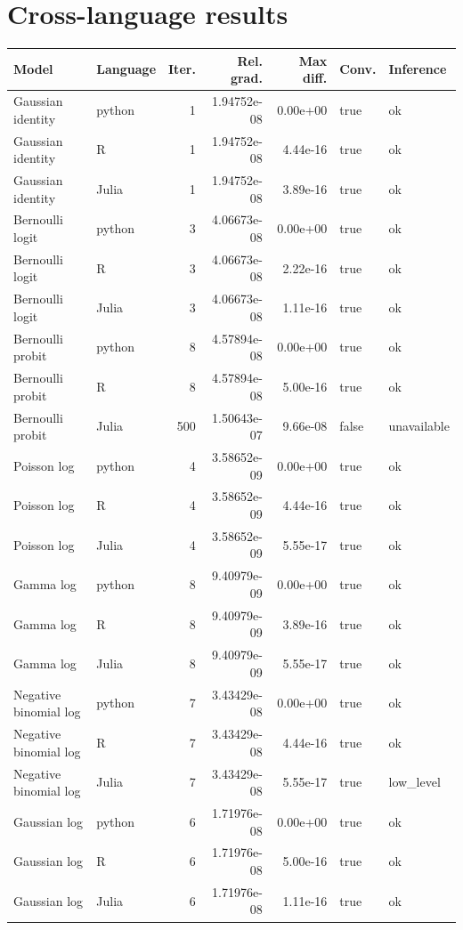 \documentclass[11pt]{article}
\begin{document}
\section{Cross-language results}
\scriptsize
\begin{longtable}{llrrrll}
\toprule Model & Language & Iter. & Rel. grad. & Max diff. & Conv. & Inference \\ \midrule\endhead
Gaussian identity & python & 1 & 1.94752e-08 & 0.00e+00 & true & ok \\
Gaussian identity & R & 1 & 1.94752e-08 & 4.44e-16 & true & ok \\
Gaussian identity & Julia & 1 & 1.94752e-08 & 3.89e-16 & true & ok \\
Bernoulli logit & python & 3 & 4.06673e-08 & 0.00e+00 & true & ok \\
Bernoulli logit & R & 3 & 4.06673e-08 & 2.22e-16 & true & ok \\
Bernoulli logit & Julia & 3 & 4.06673e-08 & 1.11e-16 & true & ok \\
Bernoulli probit & python & 8 & 4.57894e-08 & 0.00e+00 & true & ok \\
Bernoulli probit & R & 8 & 4.57894e-08 & 5.00e-16 & true & ok \\
Bernoulli probit & Julia & 500 & 1.50643e-07 & 9.66e-08 & false & unavailable \\
Poisson log & python & 4 & 3.58652e-09 & 0.00e+00 & true & ok \\
Poisson log & R & 4 & 3.58652e-09 & 4.44e-16 & true & ok \\
Poisson log & Julia & 4 & 3.58652e-09 & 5.55e-17 & true & ok \\
Gamma log & python & 8 & 9.40979e-09 & 0.00e+00 & true & ok \\
Gamma log & R & 8 & 9.40979e-09 & 3.89e-16 & true & ok \\
Gamma log & Julia & 8 & 9.40979e-09 & 5.55e-17 & true & ok \\
Negative binomial log & python & 7 & 3.43429e-08 & 0.00e+00 & true & ok \\
Negative binomial log & R & 7 & 3.43429e-08 & 4.44e-16 & true & ok \\
Negative binomial log & Julia & 7 & 3.43429e-08 & 5.55e-17 & true & low\_level \\
Gaussian log & python & 6 & 1.71976e-08 & 0.00e+00 & true & ok \\
Gaussian log & R & 6 & 1.71976e-08 & 5.00e-16 & true & ok \\
Gaussian log & Julia & 6 & 1.71976e-08 & 1.11e-16 & true & ok \\

\end{longtable}
\end{document}
